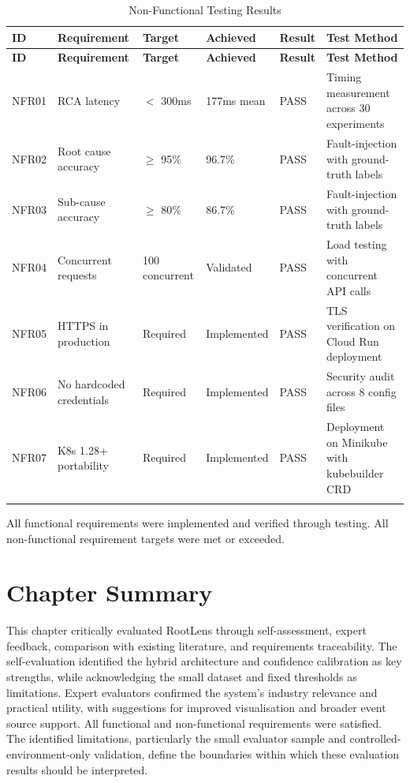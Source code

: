 \begin{xltabular}{\textwidth}{|p{1.2cm}|p{3cm}|p{1.8cm}|p{1.8cm}|p{1.5cm}|X|}
\hline
\textbf{ID} & \textbf{Requirement} & \textbf{Target} & \textbf{Achieved} & \textbf{Result} & \textbf{Test Method} \\ \hline
\endfirsthead
\hline
\textbf{ID} & \textbf{Requirement} & \textbf{Target} & \textbf{Achieved} & \textbf{Result} & \textbf{Test Method} \\ \hline
\endhead
NFR01 & RCA latency & $<$ 300ms & 177ms mean & PASS & Timing measurement across 30 experiments \\ \hline
NFR02 & Root cause accuracy & $\geq$ 95\% & 96.7\% & PASS & Fault-injection with ground-truth labels \\ \hline
NFR03 & Sub-cause accuracy & $\geq$ 80\% & 86.7\% & PASS & Fault-injection with ground-truth labels \\ \hline
NFR04 & Concurrent requests & 100 concurrent & Validated & PASS & Load testing with concurrent API calls \\ \hline
NFR05 & HTTPS in production & Required & Implemented & PASS & TLS verification on Cloud Run deployment \\ \hline
NFR06 & No hardcoded credentials & Required & Implemented & PASS & Security audit across 8 config files \\ \hline
NFR07 & K8s 1.28+ portability & Required & Implemented & PASS & Deployment on Minikube with kubebuilder CRD \\ \hline
\caption{Non-Functional Testing Results}
\label{tab:nfr_status}
\end{xltabular}

All functional requirements were implemented and verified through testing. All non-functional requirement targets were met or exceeded.

\section{Chapter Summary}
This chapter critically evaluated RootLens through self-assessment, expert feedback, comparison with existing literature, and requirements traceability. The self-evaluation identified the hybrid architecture and confidence calibration as key strengths, while acknowledging the small dataset and fixed thresholds as limitations. Expert evaluators confirmed the system's industry relevance and practical utility, with suggestions for improved visualisation and broader event source support. All functional and non-functional requirements were satisfied. The identified limitations, particularly the small evaluator sample and controlled-environment-only validation, define the boundaries within which these evaluation results should be interpreted.
